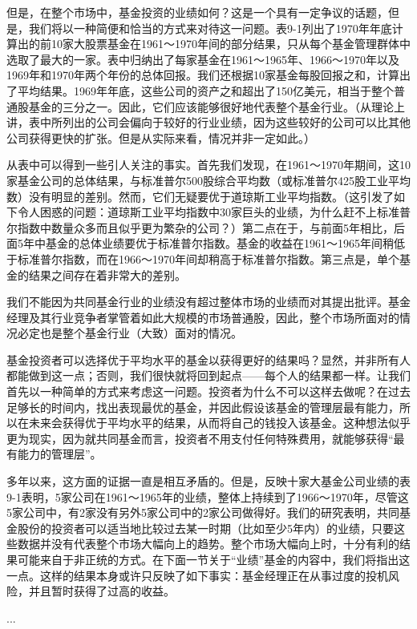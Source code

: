 \documentclass[12pt,oneside]{book}
\begin{document}
但是，在整个市场中，基金投资的业绩如何？这是一个具有一定争议的话题，但是，我们将以一种简便和恰当的方式来对待这一问题。表9-1列出了1970年年底计算出的前10家大股票基金在1961～1970年间的部分结果，只从每个基金管理群体中选取了最大的一家。表中归纳出了每家基金在1961～1965年、1966～1970年以及1969年和1970年两个年份的总体回报。我们还根据10家基金每股回报之和，计算出了平均结果。1969年年底，这些公司的资产之和超出了150亿美元，相当于整个普通股基金的三分之一。因此，它们应该能够很好地代表整个基金行业。（从理论上讲，表中所列出的公司会偏向于较好的行业业绩，因为这些较好的公司可以比其他公司获得更快的扩张。但是从实际来看，情况并非一定如此。）

从表中可以得到一些引人关注的事实。首先我们发现，在1961～1970年期间，这10家基金公司的总体结果，与标准普尔500股综合平均数（或标准普尔425股工业平均数）没有明显的差别。然而，它们无疑要优于道琼斯工业平均指数。（这引发了如下令人困惑的问题：道琼斯工业平均指数中30家巨头的业绩，为什么赶不上标准普尔指数中数量众多而且似乎更为繁杂的公司？）第二点在于，与前面5年相比，后面5年中基金的总体业绩要优于标准普尔指数。基金的收益在1961～1965年间稍低于标准普尔指数，而在1966～1970年间却稍高于标准普尔指数。第三点是，单个基金的结果之间存在着非常大的差别。

我们不能因为共同基金行业的业绩没有超过整体市场的业绩而对其提出批评。基金经理及其行业竞争者掌管着如此大规模的市场普通股，因此，整个市场所面对的情况必定也是整个基金行业（大致）面对的情况。

基金投资者可以选择优于平均水平的基金以获得更好的结果吗？显然，并非所有人都能做到这一点；否则，我们很快就将回到起点——每个人的结果都一样。让我们首先以一种简单的方式来考虑这一问题。投资者为什么不可以这样去做呢？在过去足够长的时间内，找出表现最优的基金，并因此假设该基金的管理层最有能力，所以在未来会获得优于平均水平的结果，从而将自己的钱投入该基金。这种想法似乎更为现实，因为就共同基金而言，投资者不用支付任何特殊费用，就能够获得“最有能力的管理层”。

多年以来，这方面的证据一直是相互矛盾的。但是，反映十家大基金公司业绩的表9-1表明，5家公司在1961～1965年的业绩，整体上持续到了1966～1970年，尽管这5家公司中，有2家没有另外5家公司中的2家公司做得好。我们的研究表明，共同基金股份的投资者可以适当地比较过去某一时期（比如至少5年内）的业绩，只要这些数据并没有代表整个市场大幅向上的趋势。整个市场大幅向上时，十分有利的结果可能来自于非正统的方式。在下面一节关于“业绩”基金的内容中，我们将指出这一点。这样的结果本身或许只反映了如下事实：基金经理正在从事过度的投机风险，并且暂时获得了过高的收益。

...
\end{document}
